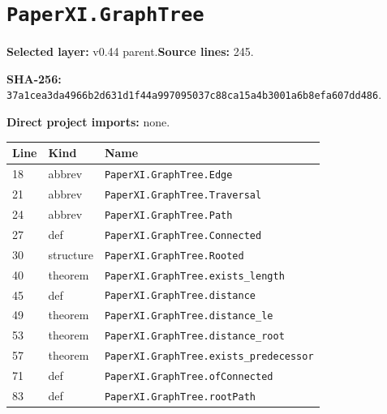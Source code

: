\documentclass[10pt,oneside]{book}
\begin{document}
\section{\texorpdfstring{\nolinkurl{PaperXI.GraphTree}}{PaperXI.GraphTree}}\label{module:PaperXI.GraphTree}

\textbf{Selected layer:} v0.44 parent.\quad\textbf{Source lines:} 245.\par\textbf{SHA-256:} {\scriptsize\nolinkurl{37a1cea3da4966b2d631d1f44a997095037c88ca15a4b3001a6b8efa607dd486}}.


\textbf{Direct project imports:} none.

\begin{longtable}{@{}p{}p{}p{}@{}}\toprule Line&Kind&Name\\\midrule\endhead

18&abbrev&\nolinkurl{PaperXI.GraphTree.Edge}\\

21&abbrev&\nolinkurl{PaperXI.GraphTree.Traversal}\\

24&abbrev&\nolinkurl{PaperXI.GraphTree.Path}\\

27&def&\nolinkurl{PaperXI.GraphTree.Connected}\\

30&structure&\nolinkurl{PaperXI.GraphTree.Rooted}\\

40&theorem&\nolinkurl{PaperXI.GraphTree.exists_length}\\

45&def&\nolinkurl{PaperXI.GraphTree.distance}\\

49&theorem&\nolinkurl{PaperXI.GraphTree.distance_le}\\

53&theorem&\nolinkurl{PaperXI.GraphTree.distance_root}\\

57&theorem&\nolinkurl{PaperXI.GraphTree.exists_predecessor}\\

71&def&\nolinkurl{PaperXI.GraphTree.ofConnected}\\

83&def&\nolinkurl{PaperXI.GraphTree.rootPath}\\


\end{longtable}
\end{document}
